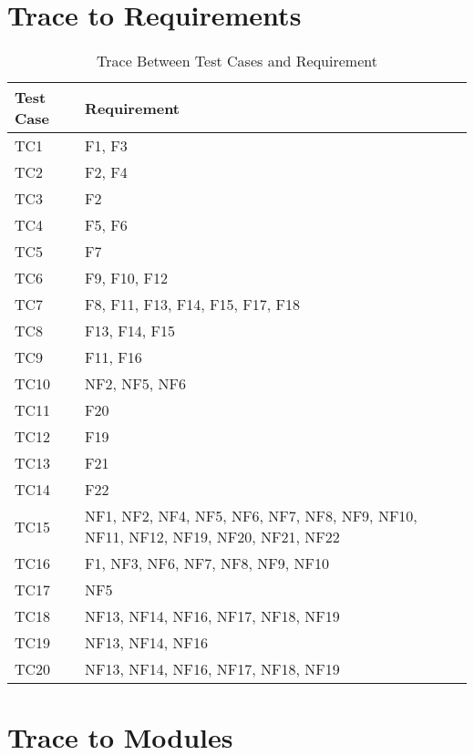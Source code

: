 \documentclass[12pt, titlepage]{article}
\begin{document}
\section{Trace to Requirements}

\begin{table}[H]
\centering
\begin{tabular}{p{} p{}}
\toprule
\textbf{Test Case} & \textbf{Requirement}\\
\midrule
TC1  & F1, F3\\
TC2  & F2, F4\\
TC3  & F2\\
TC4  & F5, F6\\
TC5  & F7\\
TC6  & F9, F10, F12\\
TC7  & F8, F11, F13, F14, F15, F17, F18\\
TC8  & F13, F14, F15\\
TC9  & F11, F16\\
TC10 & NF2, NF5, NF6\\
TC11 & F20\\
TC12 & F19\\
TC13 & F21\\
TC14 & F22\\
TC15 & NF1, NF2, NF4, NF5, NF6, NF7, NF8, NF9, NF10, NF11, NF12, NF19, NF20, NF21, NF22\\
TC16 & F1, NF3, NF6, NF7, NF8, NF9, NF10\\
TC17 & NF5\\
TC18 & NF13, NF14, NF16, NF17, NF18, NF19\\
TC19 & NF13, NF14, NF16\\
TC20 & NF13, NF14, NF16, NF17, NF18, NF19\\

\bottomrule
\end{tabular}
\caption{Trace Between Test Cases and Requirement}
\end{table}

\section{Trace to Modules}
\end{document}
